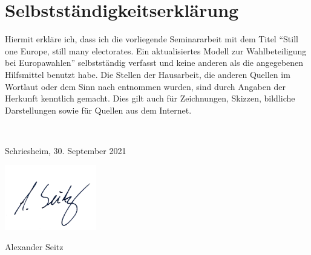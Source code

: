 \section*{Selbstständigkeitserklärung}

Hiermit erkläre ich, dass ich die vorliegende Seminararbeit mit dem Titel \enquote{Still one Europe, still many electorates. Ein aktualisiertes Modell zur Wahlbeteiligung bei Europawahlen} selbstständig verfasst und keine anderen als die angegebenen Hilfsmittel benutzt habe. Die Stellen der Hausarbeit, die anderen Quellen im Wortlaut oder dem Sinn nach entnommen wurden, sind durch Angaben der Herkunft kenntlich gemacht. Dies gilt auch für Zeichnungen, Skizzen, bildliche Darstellungen sowie für Quellen aus dem Internet.

\

\noindent
Schriesheim, 30. September 2021

\includegraphics[width=4cm]{signature}

\noindent
Alexander Seitz
